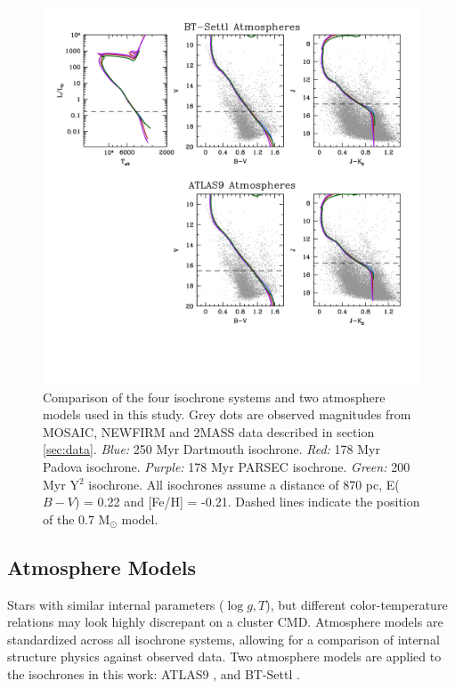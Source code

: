 \documentclass[iop]{emulateapj}
\begin{document}
\begin{figure} \centering
\includegraphics[trim = 0mm 120mm 20mm 20mm, clip, width=6in]{fig5.png}		%
\caption{Comparison of the four isochrone systems and two atmosphere models used in this study. Grey dots are observed magnitudes from MOSAIC, NEWFIRM and 2MASS data described in section \ref{sec:data}. \emph{Blue:} 250 Myr Dartmouth isochrone. \emph{Red:} 178 Myr Padova isochrone. \emph{Purple:} 178 Myr PARSEC isochrone. \emph{Green:} 200 Myr Y$^2$ isochrone. All isochrones assume a distance of 870 pc, E($B-V$) = 0.22 and [Fe/H] = -0.21. Dashed lines indicate the position of the 0.7 M$_\odot$ model. \label{fig:isocompare}}
\end{figure}

\subsection{Atmosphere Models}
Stars with similar internal parameters ($\log g, T$), but different color-temperature relations may look highly discrepant on a cluster CMD. Atmosphere models are standardized across all isochrone systems, allowing for a comparison of internal structure physics against observed data. Two atmosphere models are applied to the isochrones in this work: ATLAS9 \citep{2003IAUS..210P.A20C}, and BT-Settl \citep{2012RSPTA.370.2765A}.
\end{document}
